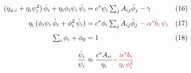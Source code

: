 \documentclass[border=4pt,varwidth=\maxdimen]{standalone}
\begin{document}
\fontsize{14}{20}\selectfont
$\begin{aligned}
(\eta_{\phi,i}+\eta_i\psi_i^2)\,\dot\phi_i+\eta_i\phi_i\psi_i\,\dot\psi_i&=c^*\psi_i\textstyle\sum_j A_{ij}\bar\phi_j-\gamma &&\text{(16)}\\[4pt]
\eta_i\,(\phi_i\psi_i\,\dot\phi_i+\phi_i^2\,\dot\psi_i)&=c^*\phi_i\textstyle\sum_j A_{ij}\bar\phi_j\;{\color[HTML]{A61E1E}-\;\alpha^*b_i\,\psi_i} &&\text{(17)}\\[4pt]
\textstyle\sum_i\phi_i+\phi_0&=1 &&\text{(18)}\\[8pt]
\frac{\dot\psi_i}{\psi_i}&\approx\frac{c^*A_{ii}}{\eta_i}{\color[HTML]{A61E1E}-\frac{\alpha^*b_i}{\eta_i\,\phi_i^2}}&&
\end{aligned}$
\end{document}
